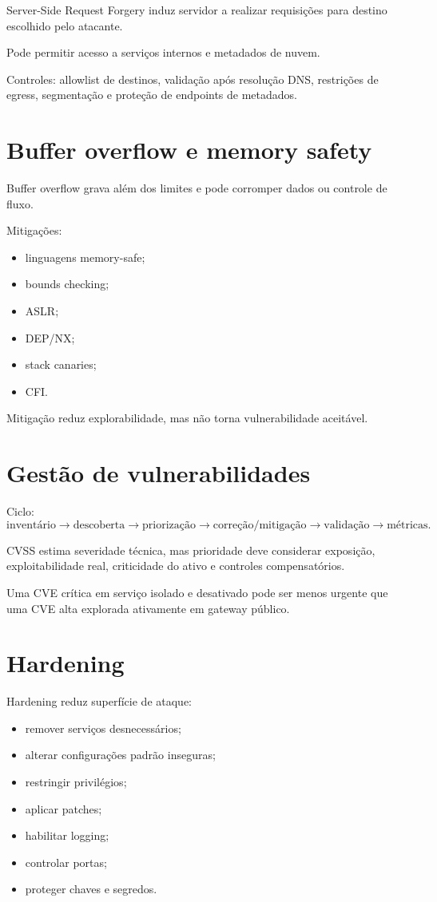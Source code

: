 Server-Side Request Forgery induz servidor a realizar requisições para destino escolhido pelo atacante.

Pode permitir acesso a serviços internos e metadados de nuvem.

Controles: allowlist de destinos, validação após resolução DNS, restrições de egress, segmentação e proteção de endpoints de metadados.

\section{Buffer overflow e memory safety}

Buffer overflow grava além dos limites e pode corromper dados ou controle de fluxo.

Mitigações:
\begin{itemize}
\item linguagens memory-safe;
\item bounds checking;
\item ASLR;
\item DEP/NX;
\item stack canaries;
\item CFI.
\end{itemize}

Mitigação reduz explorabilidade, mas não torna vulnerabilidade aceitável.

\section{Gestão de vulnerabilidades}

Ciclo:
\[
\text{inventário}\rightarrow
\text{descoberta}\rightarrow
\text{priorização}\rightarrow
\text{correção/mitigação}\rightarrow
\text{validação}\rightarrow
\text{métricas}.
\]

CVSS estima severidade técnica, mas prioridade deve considerar exposição, exploitabilidade real, criticidade do ativo e controles compensatórios.

Uma CVE crítica em serviço isolado e desativado pode ser menos urgente que uma CVE alta explorada ativamente em gateway público.

\section{Hardening}

Hardening reduz superfície de ataque:
\begin{itemize}
\item remover serviços desnecessários;
\item alterar configurações padrão inseguras;
\item restringir privilégios;
\item aplicar patches;
\item habilitar logging;
\item controlar portas;
\item proteger chaves e segredos.
\end{itemize}

